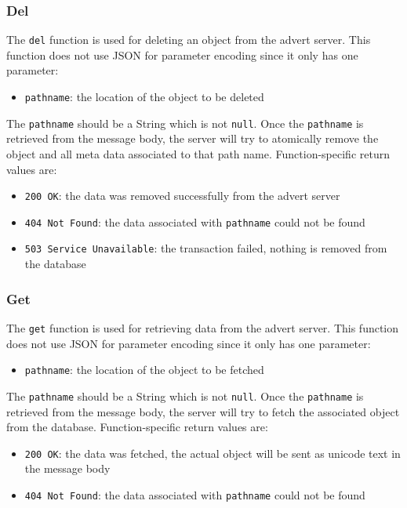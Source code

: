 \subsubsection{Del}
\label{del}
The \texttt{del} function is used for deleting an object from the advert
server. This function does not use JSON for parameter encoding since it only
has one parameter:

\begin{itemize}
  \item \texttt{pathname}: the location of the object to be deleted
\end{itemize}

The \texttt{pathname} should be a String which is not \texttt{null}. Once the
\texttt{pathname} is retrieved from the message body, the server will try to
atomically remove the object and all meta data associated to that path name.
Function-specific return values are:

\begin{itemize}
  \item \texttt{200 OK}: the data was removed successfully from the advert
  server
  \item \texttt{404 Not Found}: the data associated with \texttt{pathname}
  could not be found
  \item \texttt{503 Service Unavailable}: the transaction failed, nothing is
  removed from the database
\end{itemize}

\subsubsection{Get}
\label{get}
The \texttt{get} function is used for retrieving data from the advert server.
This function does not use JSON for parameter encoding since it only has one
parameter:

\begin{itemize}
  \item \texttt{pathname}: the location of the object to be fetched
\end{itemize}

The \texttt{pathname} should be a String which is not \texttt{null}. Once the
\texttt{pathname} is retrieved from the message body, the server will try to
fetch the associated object from the database. Function-specific return values
are:

\begin{itemize}
  \item \texttt{200 OK}: the data was fetched, the actual object will be sent
  as unicode text in the message body
  \item \texttt{404 Not Found}: the data associated with \texttt{pathname}
  could not be found
\end{itemize}

